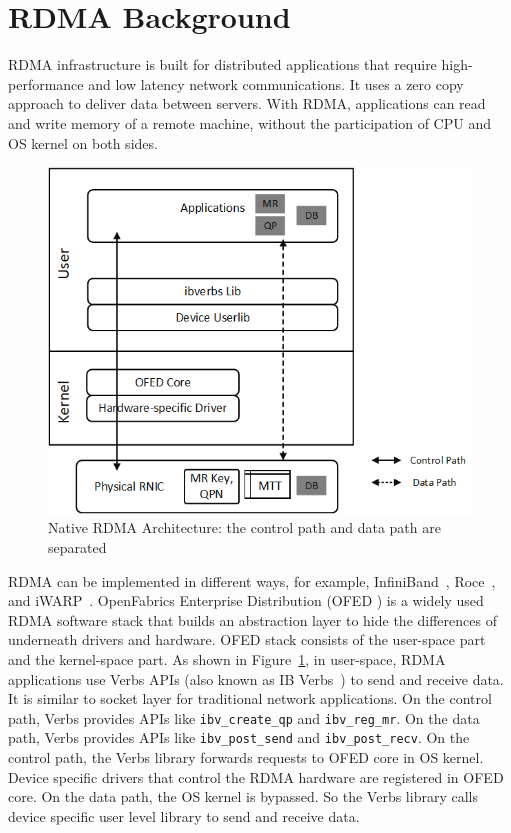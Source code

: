 \section{RDMA Background} \label{background}
RDMA infrastructure is built for distributed applications that require high-performance and low latency network communications. It uses a zero copy approach to deliver data between servers. With RDMA, applications can read and write memory of a remote machine, without the participation of CPU and OS kernel on both sides.

\begin{figure}[!ht]
	\centering
	\includegraphics[width=0.8\linewidth]{images/rdma-feat.png}
	\caption{Native RDMA Architecture: the control path and data path are separated}
	\label{fig:rdma-feat}
\end{figure}

RDMA can be implemented in different ways, for example, InfiniBand~\cite{infiniband}, Roce~\cite{roce}, and iWARP~\cite{iwarp}.
OpenFabrics Enterprise Distribution (OFED \cite{ofed}) is a widely used RDMA software stack that builds an abstraction layer to hide the differences of underneath drivers and hardware.
OFED stack consists of the user-space part and the kernel-space part.
As shown in Figure~\ref{fig:rdma-feat}, in user-space, RDMA applications use Verbs APIs (also known as IB Verbs~\cite{verbs}) to send and receive data. It is similar to socket layer for traditional network applications. On the control path, Verbs provides APIs like \texttt{ibv\_create\_qp} and \texttt{ibv\_reg\_mr}. On the data path, Verbs provides APIs like \texttt{ibv\_post\_send} and \texttt{ibv\_post\_recv}. On the control path, the Verbs library forwards requests to OFED core in OS kernel. Device specific drivers that control the RDMA hardware are registered in OFED core. On the data path, the OS kernel is bypassed. So the Verbs library calls device specific user level library to send and receive data.

